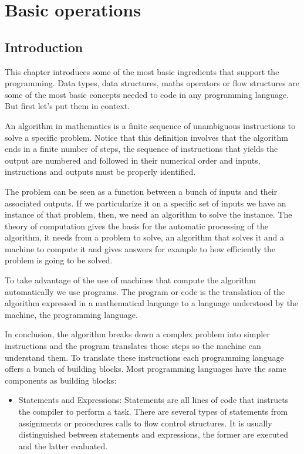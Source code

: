 \chapter{Basic operations} \label{chap:basicop}


    \section{Introduction} 

This chapter introduces some of the most basic ingredients that support the programming.
Data types, data structures, maths operators or flow structures are some of the most basic concepts needed to code in any programming language. 
But first let's put them in context. 

An algorithm in mathematics is a finite sequence of unambiguous instructions to solve a specific problem. 
Notice that this definition involves that the algorithm ends in a finite number of steps, 
the sequence of instructions that yields the output are numbered and followed in their numerical order and
inputs, instructions and outputs must be properly identified. 

The problem can be seen as a function between a bunch of inputs and their associated outputs.
If we particularize it on a specific set of inputs we have an instance of that problem, 
then, we need an algorithm to solve the instance.
The theory of computation gives the basis for the automatic processing of the algorithm, it needs from a 
problem to solve, an algorithm that solves it and a machine to compute it 
and gives answers for example to how efficiently the problem is going to be solved. 

To take advantage of the use of machines that compute the algorithm automatically we use programs.
The program or code is the translation of the algorithm expressed in a mathematical language to a language understood by 
the machine, the programming language. 

In conclusion, the algorithm breaks down a complex problem into simpler instructions 
and the program translates those steps so the machine can understand them. 
To translate these instructions each programming language offers a bunch of building blocks.
Most programming languages have the same components as building blocks:
\begin{itemize}
    \item Statements and Expressions: Statements are all lines of code that instructs the compiler to perform a task.
    There are several types of statements from assignments or procedures calls to flow control structures. 
    It is usually distinguished between statements and expressions, the former are executed and the latter evaluated.
\end{itemize}

